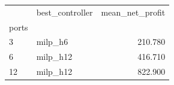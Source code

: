 \begin{tabular}{llr}
\toprule
 & best_controller & mean_net_profit \\
ports &  &  \\
\midrule
3 & milp_h6 & 210.780 \\
6 & milp_h12 & 416.710 \\
12 & milp_h12 & 822.900 \\
\bottomrule
\end{tabular}
